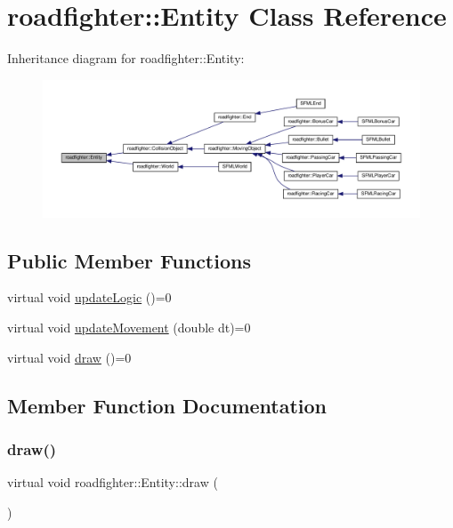 \hypertarget{classroadfighter_1_1Entity}{}\section{roadfighter\+:\+:Entity Class Reference}
\label{classroadfighter_1_1Entity}


Inheritance diagram for roadfighter\+:\+:Entity\+:\nopagebreak
\begin{figure}[H]
\begin{center}
\leavevmode
\includegraphics[width=350pt]{classroadfighter_1_1Entity__inherit__graph}
\end{center}
\end{figure}
\subsection*{Public Member Functions}
\begin{DoxyCompactItemize}
\item 
virtual void \hyperlink{classroadfighter_1_1Entity_a54c00f1af306290bae3e4b84e196566b}{update\+Logic} ()=0
\item 
virtual void \hyperlink{classroadfighter_1_1Entity_a66614a11004d6f9516473f60b530f689}{update\+Movement} (double dt)=0
\item 
virtual void \hyperlink{classroadfighter_1_1Entity_ac516f8005f969ad5a86c252e5a3640ee}{draw} ()=0
\end{DoxyCompactItemize}


\subsection{Member Function Documentation}
\mbox{\label{classroadfighter_1_1Entity_ac516f8005f969ad5a86c252e5a3640ee}} 
\subsubsection{\texorpdfstring{draw()}{draw()}}
{\footnotesize\ttfamily virtual void roadfighter\+::\+Entity\+::draw (\begin{DoxyParamCaption}{ }\end{DoxyParamCaption})\hspace{0.3cm}{\ttfamily [pure virtual]}}

